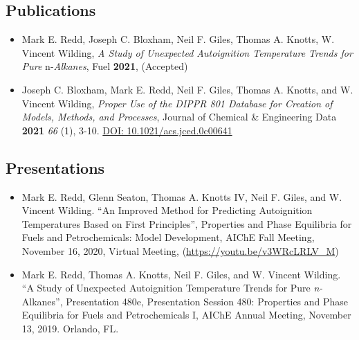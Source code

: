\hypertarget{publications}{%
\subsection{Publications}\label{publications}}


\begin{itemize}
\tightlist
\item
  Mark E. Redd, Joseph C. Bloxham, Neil F. Giles, Thomas A. Knotts, W.
  Vincent Wilding, \emph{A Study of Unexpected Autoignition Temperature
  Trends for Pure} n-\emph{Alkanes}, Fuel \textbf{2021}, (Accepted)
\item
  Joseph C. Bloxham, Mark E. Redd, Neil F. Giles, Thomas A. Knotts, and
  W. Vincent Wilding, \emph{Proper Use of the DIPPR 801 Database for
  Creation of Models, Methods, and Processes}, Journal of Chemical \&
  Engineering Data \textbf{2021} \emph{66} (1), 3-10.
  \href{https://doi.org/10.1021/acs.jced.0c00641}{DOI:
  10.1021/acs.jced.0c00641}
\end{itemize}

\hypertarget{presentations}{%
\subsection{Presentations}\label{presentations}}

\begin{itemize}
\tightlist
\item
  Mark E. Redd, Glenn Seaton, Thomas A. Knotts IV, Neil F. Giles, and W.
  Vincent Wilding. ``An Improved Method for Predicting Autoignition
  Temperatures Based on First Principles'', Properties and Phase
  Equilibria for Fuels and Petrochemicals: Model Development, AIChE Fall
  Meeting, November 16, 2020, Virtual Meeting,
  (\url{https://youtu.be/v3WRcLRLV_M})
\item
  Mark E. Redd, Thomas A. Knotts, Neil F. Giles, and W. Vincent Wilding.
  ``A Study of Unexpected Autoignition Temperature Trends for Pure
  \emph{n-}Alkanes'', Presentation 480e, Presentation Session 480:
  Properties and Phase Equilibria for Fuels and Petrochemicals I, AIChE
  Annual Meeting, November 13, 2019. Orlando, FL.
\end{itemize}
